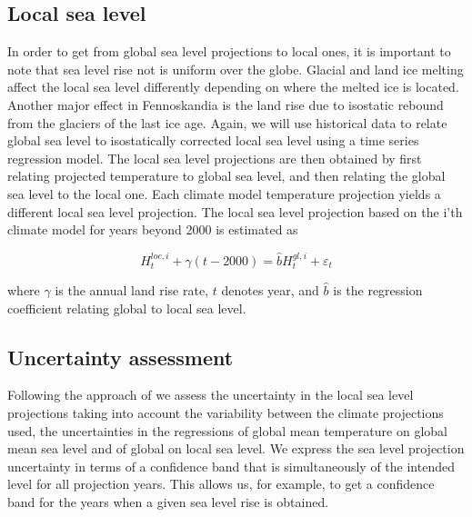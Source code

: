 \documentclass[draft,linenumbers]{agujournal}
\begin{document}
\subsection{Local sea level}
In order to get from global sea level projections to local ones, it is important to note that sea level rise not is uniform over the globe. Glacial and land ice melting affect the local sea level differently depending on where the melted ice is located.
Another major effect in Fennoskandia is the land rise due to isostatic rebound from the glaciers of the last ice age. 
Again, we will use historical data to relate global sea level to isostatically corrected local sea level using a time series regression model. 
The local sea level projections are then obtained by first relating projected temperature to global sea level, and then relating the global sea level to the local one. Each climate model temperature projection yields a different local sea level projection. The local sea level projection based on the i'th climate model for years beyond 2000 is estimated as

\[H_t^{loc,i} + \gamma (t -2000 ) = {\hat b} H_t^{gl,i}  + {\varepsilon _t}\]


where $\gamma$ is the annual land rise rate, $t$ denotes year, and $ {\hat b} $ is the regression coefficient relating global to local sea level.




\subsection{Uncertainty assessment}
\label{unc_ass}
Following the approach of \citet{Guttorp2014} we assess the uncertainty in the local sea level projections taking into account the variability between the climate projections used, the uncertainties in the regressions of global mean temperature on global mean sea level and of global on local sea level. We express the sea level projection uncertainty in terms of a confidence band that is simultaneously of the intended  level  for all projection years. This allows us, for example, to get a confidence band for the years when a given sea level rise is obtained. 
\end{document}
